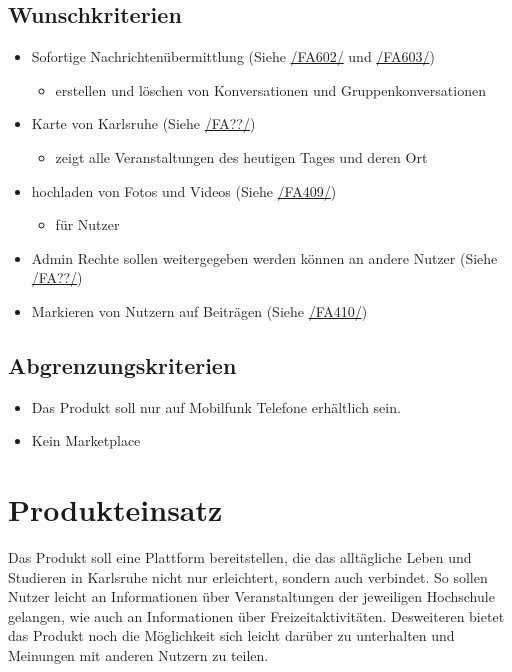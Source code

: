 \documentclass[parskip=full]{scrartcl}
\begin{document}
	\subsection{Wunschkriterien}
		\begin{itemize}[nosep] 
			\item Sofortige Nachrichtenübermittlung (Siehe \hyperref[sec:FA602]{/FA602/} und \hyperref[sec:FA603]{/FA603/})
			\begin{itemize}
				\item erstellen und löschen von Konversationen und Gruppenkonversationen
			\end{itemize}
			
			\item Karte von Karlsruhe (Siehe \hyperref[sec:FA??]{/FA??/})
				\begin{itemize}
					\item zeigt alle Veranstaltungen des heutigen Tages und deren Ort
				\end{itemize}
			\item hochladen von Fotos und Videos (Siehe \hyperref[sec:FA409]{/FA409/})
				\begin{itemize}
					\item für Nutzer
				\end{itemize}
			\item Admin Rechte sollen weitergegeben werden können an andere Nutzer 
			(Siehe \hyperref[sec:FA??]{/FA??/})
			\item Markieren von Nutzern auf Beiträgen (Siehe \hyperref[sec:FA410]{/FA410/})
		\end{itemize}
		
	\subsection{Abgrenzungskriterien}
	\begin{itemize}
		\item Das Produkt soll nur auf Mobilfunk Telefone erhältlich sein.
		\item Kein Marketplace
	\end{itemize}
	\newpage
	
	
	\section{Produkteinsatz}
	Das Produkt soll eine Plattform bereitstellen, die das alltägliche Leben und Studieren in Karlsruhe nicht nur erleichtert, sondern auch verbindet. So sollen Nutzer leicht an Informationen über Veranstaltungen der jeweiligen Hochschule gelangen, wie auch an Informationen über Freizeitaktivitäten. Desweiteren bietet das Produkt noch die Möglichkeit sich leicht darüber zu unterhalten und Meinungen mit anderen Nutzern zu teilen.
	
\end{document}
